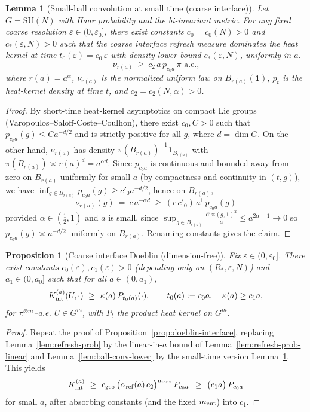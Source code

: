 \documentclass[11pt]{amsart}
\theoremstyle{plain}
\newtheorem{lemma}[theorem]{Lemma}
\newtheorem{proposition}[theorem]{Proposition}
\theoremstyle{definition}
\theoremstyle{remark}
\begin{document}
\begin{lemma}[Small-ball convolution at small time (coarse interface)]\label{lem:ball-conv-lower-smalltime}
Let $G=\mathrm{SU}(N)$ with Haar probability and the bi-invariant metric. For any fixed coarse resolution $\varepsilon\in(0,\varepsilon_0]$, there exist constants $c_0=c_0(N)>0$ and $c_*(\varepsilon,N)>0$ such that the coarse interface refresh measure dominates the heat kernel at time $t_0(\varepsilon)=c_0\,\varepsilon$ with density lower bound $c_*(\varepsilon,N)$, uniformly in $a$.
\[
  \nu_{r(a)}\ \ge\ c_2\, a\, p_{c_0 a}\,\pi\text{-a.e.,}
\]
where $r(a)=a^{\alpha}$, $\nu_{r(a)}$ is the normalized uniform law on $B_{r(a)}(\mathbf 1)$, $p_t$ is the heat-kernel density at time $t$, and $c_2=c_2(N,\alpha)>0$.
\end{lemma}
\begin{proof}
By short-time heat-kernel asymptotics on compact Lie groups (Varopoulos–Saloff-Coste–Coulhon), there exist $c_0,C>0$ such that $p_{c_0 a}(g)\le C a^{-d/2}$ and is strictly positive for all $g$, where $d=\dim G$. On the other hand, $\nu_{r(a)}$ has density $\pi(B_{r(a)})^{-1}\mathbf 1_{B_{r(a)}}$ with $\pi(B_{r(a)})\asymp r(a)^d=a^{\alpha d}$. Since $p_{c_0 a}$ is continuous and bounded away from zero on $B_{r(a)}$ uniformly for small $a$ (by compactness and continuity in $(t,g)$), we have $\inf_{g\in B_{r(a)}} p_{c_0 a}(g)\ge c'_0 a^{-d/2}$, hence on $B_{r(a)}$,
\[
  \nu_{r(a)}(g)\ =\ c\,a^{-\alpha d}\ \ge\ (c\,c'_0)\, a^{1}\, p_{c_0 a}(g)
\]
provided $\alpha\in(\tfrac12,1)$ and $a$ is small, since $\sup_{g\in B_{r(a)}} \frac{\mathrm{dist}(g,\mathbf 1)^2}{a}\le a^{2\alpha-1}\to 0$ so $p_{c_0 a}(g)\asymp a^{-d/2}$ uniformly on $B_{r(a)}$. Renaming constants gives the claim.
\end{proof}

\begin{proposition}[Coarse interface Doeblin (dimension-free)]\label{prop:doeblin-interface-scaled}
Fix $\varepsilon\in(0,\varepsilon_0]$. There exist constants $c_0(\varepsilon),c_1(\varepsilon)>0$ (depending only on $(R_*,\varepsilon,N)$) and $a_1\in(0,a_0]$ such that for all $a\in(0,a_1)$,
\[
  K_{\rm int}^{(a)}(U,\cdot)\ \ge\ \kappa(a)\, P_{t_0(a)}(\cdot),\qquad t_0(a):=c_0 a,\quad \kappa(a)\ge c_1 a,
\]
for $\pi^{\otimes m}$–a.e. $U\in G^m$, with $P_{t}$ the product heat kernel on $G^m$.
\end{proposition}
\begin{proof}
Repeat the proof of Proposition~\ref{prop:doeblin-interface}, replacing Lemma~\ref{lem:refresh-prob} by the linear-in-$a$ bound of Lemma~\ref{lem:refresh-prob-linear} and Lemma~\ref{lem:ball-conv-lower} by the small-time version Lemma~\ref{lem:ball-conv-lower-smalltime}. This yields
\[
  K_{\rm int}^{(a)}\ \ge\ c_{\rm geo}\,\big( \alpha_{\rm ref}(a)\,c_2\big)^{m_{\rm cut}}\, P_{c_0 a}\,\ \ge\ \big(c_1 a\big)\, P_{c_0 a}
\]
for small $a$, after absorbing constants (and the fixed $m_{\rm cut}$) into $c_1$.
\end{proof}
\end{document}
